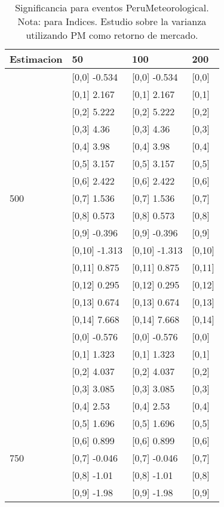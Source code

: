 \begin{table}

\caption{Significancia para eventos PeruMeteorological. Nota: para Indices. Estudio sobre la varianza utilizando PM como retorno de mercado.}
\centering
\begin{tabular}[t]{llll}
\toprule
Estimacion & 50 & 100 & 200\\
\midrule
 & {}[0,0] -0.534 & {}[0,0] -0.534 & {}[0,0]\\
 & {}[0,1] 2.167 & {}[0,1] 2.167 & {}[0,1]\\
 & {}[0,2] 5.222 & {}[0,2] 5.222 & {}[0,2]\\
 & {}[0,3] 4.36 & {}[0,3] 4.36 & {}[0,3]\\
 & {}[0,4] 3.98 & {}[0,4] 3.98 & {}[0,4]\\
\addlinespace
 & {}[0,5] 3.157 & {}[0,5] 3.157 & {}[0,5]\\
 & {}[0,6] 2.422 & {}[0,6] 2.422 & {}[0,6]\\
500 & {}[0,7] 1.536 & {}[0,7] 1.536 & {}[0,7]\\
 & {}[0,8] 0.573 & {}[0,8] 0.573 & {}[0,8]\\
 & {}[0,9] -0.396 & {}[0,9] -0.396 & {}[0,9]\\
\addlinespace
 & {}[0,10] -1.313 & {}[0,10] -1.313 & {}[0,10]\\
 & {}[0,11] 0.875 & {}[0,11] 0.875 & {}[0,11]\\
 & {}[0,12] 0.295 & {}[0,12] 0.295 & {}[0,12]\\
 & {}[0,13] 0.674 & {}[0,13] 0.674 & {}[0,13]\\
 & {}[0,14] 7.668 & {}[0,14] 7.668 & {}[0,14]\\
\addlinespace
 & {}[0,0] -0.576 & {}[0,0] -0.576 & {}[0,0]\\
 & {}[0,1] 1.323 & {}[0,1] 1.323 & {}[0,1]\\
 & {}[0,2] 4.037 & {}[0,2] 4.037 & {}[0,2]\\
 & {}[0,3] 3.085 & {}[0,3] 3.085 & {}[0,3]\\
 & {}[0,4] 2.53 & {}[0,4] 2.53 & {}[0,4]\\
\addlinespace
 & {}[0,5] 1.696 & {}[0,5] 1.696 & {}[0,5]\\
 & {}[0,6] 0.899 & {}[0,6] 0.899 & {}[0,6]\\
750 & {}[0,7] -0.046 & {}[0,7] -0.046 & {}[0,7]\\
 & {}[0,8] -1.01 & {}[0,8] -1.01 & {}[0,8]\\
 & {}[0,9] -1.98 & {}[0,9] -1.98 & {}[0,9]\\

\end{tabular}
\end{table}
